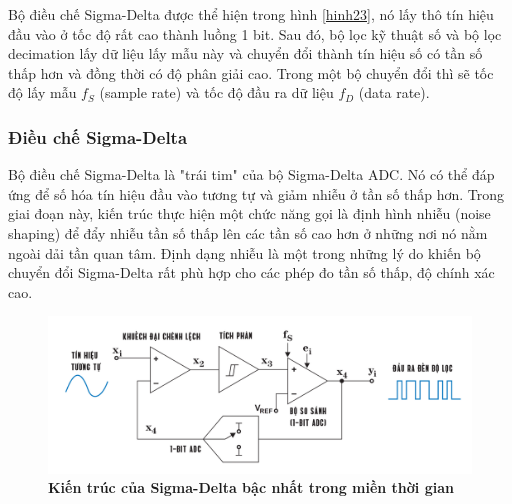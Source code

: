 Bộ điều chế Sigma-Delta được thể hiện trong hình \ref{hinh23}, nó lấy thô tín hiệu đầu vào ở tốc độ rất cao thành luồng 1 bit. Sau đó, bộ lọc kỹ thuật số và bộ lọc decimation lấy dữ liệu lấy mẫu này và chuyển đổi thành tín hiệu số có tần số thấp hơn và đồng thời có độ phân giải cao. Trong một bộ chuyển đổi thì sẽ tốc độ lấy mẫu $f_S$ (sample rate) và tốc độ đầu ra dữ liệu $f_D$ (data rate).

\subsubsection{Điều chế Sigma-Delta}
Bộ điều chế Sigma-Delta là "trái tim" của bộ Sigma-Delta ADC. Nó có thể đáp ứng để số hóa tín hiệu đầu vào tương tự và giảm nhiễu ở tần số thấp hơn. Trong giai đoạn này, kiến trúc thực hiện một chức năng gọi là định hình nhiễu (noise shaping) để đẩy nhiễu tần số thấp lên các tần số cao hơn ở những nơi nó nằm ngoài dải tần quan tâm. Định dạng nhiễu là một trong những lý do khiến bộ chuyển đổi Sigma-Delta rất phù hợp cho các phép đo tần số thấp, độ chính xác cao. \cite{Baker2011HowDA}
\begin{figure}[!ht]
    \centering
    \includegraphics[width=13cm]{Images/Chuong2/kientruc_1st.png}
    \caption[Kiến trúc của Sigma-Delta bậc nhất trong miền thời gian]{\bfseries \fontsize{12pt}{0pt}\selectfont Kiến trúc của Sigma-Delta bậc nhất trong miền thời gian}
    \label{hinh24}
\end{figure}

